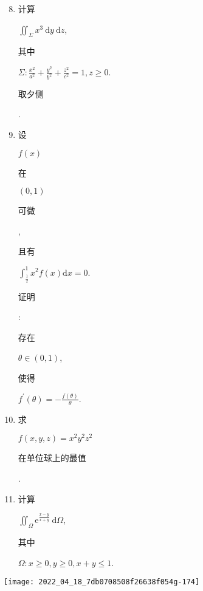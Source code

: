 \documentclass[10pt]{article}
\begin{document}
\begin{enumerate}
  \setcounter{enumi}{7}
  \item \begin{CJK}{UTF8}{mj}计算\end{CJK} $\iint_{\Sigma} x^{3} \mathrm{~d} y \mathrm{~d} z$, \begin{CJK}{UTF8}{mj}其中\end{CJK} $\Sigma: \frac{x^{2}}{a^{2}}+\frac{y^{2}}{b^{2}}+\frac{z^{2}}{c^{2}}=1, z \geq 0$. \begin{CJK}{UTF8}{mj}取夕侧\end{CJK}.

  \item \begin{CJK}{UTF8}{mj}设\end{CJK} $f(x)$ \begin{CJK}{UTF8}{mj}在\end{CJK} $(0,1)$ \begin{CJK}{UTF8}{mj}可微\end{CJK}, \begin{CJK}{UTF8}{mj}且有\end{CJK} $\int_{\frac{1}{2}}^{1} x^{2} f(x) \mathrm{d} x=0$. \begin{CJK}{UTF8}{mj}证明\end{CJK}: \begin{CJK}{UTF8}{mj}存在\end{CJK} $\theta \in(0,1)$, \begin{CJK}{UTF8}{mj}使得\end{CJK} $f^{\prime}(\theta)=-\frac{f(\theta)}{\theta}$.

  \item \begin{CJK}{UTF8}{mj}求\end{CJK} $f(x, y, z)=x^{2} y^{2} z^{2}$ \begin{CJK}{UTF8}{mj}在单位球上的最值\end{CJK}.

  \item \begin{CJK}{UTF8}{mj}计算\end{CJK} $\iint_{\Omega} \mathrm{e}^{\frac{x-y}{x+y}} \mathrm{~d} \Omega$, \begin{CJK}{UTF8}{mj}其中\end{CJK} $\Omega: x \geq 0, y \geq 0, x+y \leq 1$.

\end{enumerate}
\texttt{[image: 2022\_04\_18\_7db0708508f26638f054g-174]}
\end{document}
